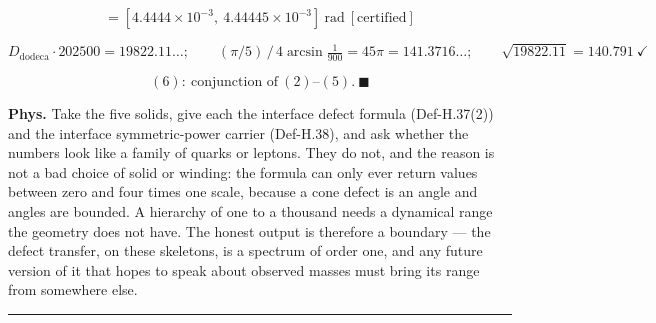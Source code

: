 \documentclass[11pt,openany]{report}
\theoremstyle{canonplain}
\theoremstyle{canondef}
\begin{document}
\[
= [4.4444\times10^{-3},\ 4.44445\times10^{-3}]\ \text{rad}\ [\text{certified}]
\]

\[
D_{\mathrm{dodeca}}\cdot202500=19822.11\ldots;\qquad(\pi/5)\,/\,4\arcsin\tfrac1{900}=45\pi=141.3716\ldots;\qquad\sqrt{19822.11}=140.791\ \checkmark
\]

\[
(6):\ \text{conjunction of}\ (2)\text{–}(5).\ \blacksquare
\]

\textbf{Phys.} Take the five solids, give each the interface defect formula (Def-H.37(2)) and the interface symmetric-power carrier (Def-H.38), and ask whether the numbers look like a family of quarks or leptons. They do not, and the reason is not a bad choice of solid or winding: the formula can only ever return values between zero and four times one scale, because a cone defect is an angle and angles are bounded. A hierarchy of one to a thousand needs a dynamical range the geometry does not have. The honest output is therefore a boundary — the defect transfer, on these skeletons, is a spectrum of order one, and any future version of it that hopes to speak about observed masses must bring its range from somewhere else.

\vspace{2pt}\noindent\rule{\textwidth}{0.4pt}\vspace{2pt}

\medskip
\end{document}
